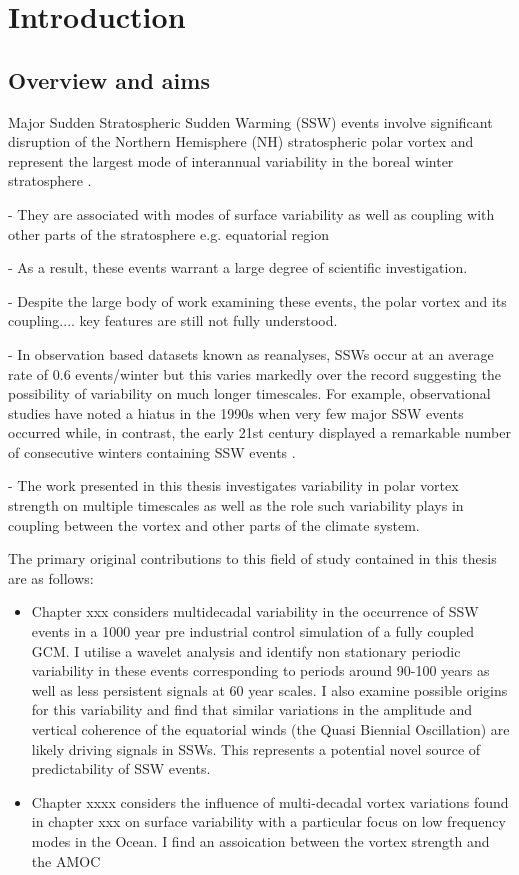 \chapter{Introduction}
\label{cha:intro}

\section{Overview and aims}
\label{sec:overview}
Major Sudden Stratospheric Sudden Warming (SSW) events involve significant disruption of the Northern Hemisphere (NH) stratospheric polar vortex and represent the largest mode of interannual variability in the boreal winter stratosphere \citep{Butler2017,baldwin2020}.

- They are associated with modes of surface variability as well as coupling with other parts of the stratosphere e.g. equatorial region

- As a result, these events warrant a large degree of scientific investigation.

- Despite the large body of work examining these events, the polar vortex and its coupling.... key features are still not fully understood.

- In observation based datasets known as reanalyses, SSWs occur at an average rate of 0.6 events/winter but this varies markedly over the record \citep{Butler2015} suggesting the possibility of variability on much longer timescales. For example, observational studies have noted a hiatus in the 1990s when very few major SSW events occurred \citep{Butler2015,Pawson1999,Shindell1999} while, in contrast, the early 21st century displayed a remarkable number of consecutive winters containing SSW events \citep{Manney2005}. 

- The work presented in this thesis investigates variability in polar vortex strength on multiple timescales as well as the role such variability plays in coupling between the vortex and other parts of the climate system. 

The primary original contributions to this field of study contained in this thesis are as follows:

\begin{itemize}
    \item Chapter xxx considers multidecadal variability in the occurrence of SSW events in a 1000 year pre industrial control simulation of a fully coupled GCM. I utilise a wavelet analysis and identify non stationary periodic variability in these events corresponding to periods around 90-100 years as well as less persistent signals at 60 year scales. I also examine possible origins for this variability and find that similar variations in the amplitude and vertical coherence of the equatorial winds (the Quasi Biennial Oscillation) are likely driving signals in SSWs. This represents a potential novel source of predictability of SSW events.
    
    \item
    Chapter xxxx considers the influence of multi-decadal vortex variations found in chapter xxx on surface variability with a particular focus on low frequency modes in the Ocean. I find an assoication between the vortex strength and the AMOC 
\end{itemize}

